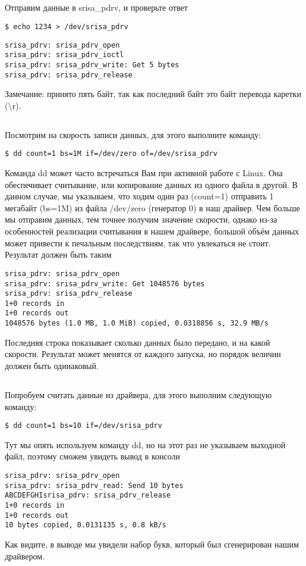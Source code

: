 \subsection{}Отправим данные в srisa\_pdrv, и проверьте ответ
\begin{lstlisting}[style=bash]
$ echo 1234 > /dev/srisa_pdrv
\end{lstlisting}
\begin{lstlisting}[style=stdout]
srisa_pdrv: srisa_pdrv_open
srisa_pdrv: srisa_pdrv_ioctl
srisa_pdrv: srisa_pdrv_write: Get 5 bytes
srisa_pdrv: srisa_pdrv_release
\end{lstlisting}
Замечание: принято пять байт, так как последний байт это байт перевода каретки (\textbackslash{}r). 

\subsection{}Посмотрим на скорость записи данных, для этого выполните команду:
\begin{lstlisting}[style=bash]
$ dd count=1 bs=1M if=/dev/zero of=/dev/srisa_pdrv 
\end{lstlisting}
Команда dd может часто встречаться Вам при активной работе с Linux. Она обеспечивает считывание, или копирование данных из одного файла в другой. В данном случае, мы указываем, что ходим один раз (count=1) отправить 1 мегабайт (bs=1M)  из файла /dev/zero (генератор 0) в наш драйвер. Чем больше мы отправим данных, тем точнее получим значение скорости, однако из-за особенностей реализации считывания в нашем драйвере, большой объём данных может привести к печальным последствиям, так что увлекаться не стоит. Результат должен быть таким
\begin{lstlisting}[style=stdout]
srisa_pdrv: srisa_pdrv_open
srisa_pdrv: srisa_pdrv_write: Get 1048576 bytes
srisa_pdrv: srisa_pdrv_release 
1+0 records in
1+0 records out
1048576 bytes (1.0 MB, 1.0 MiB) copied, 0.0318856 s, 32.9 MB/s
\end{lstlisting}
Последняя строка показывает сколько данных было передано, и на какой скорости. Результат может менятся от каждого запуска, но порядок величин должен быть одинаковый.

\subsection{}Попробуем считать данные из драйвера, для этого выполним следующую команду: 
\begin{lstlisting}[style=bash]
$ dd count=1 bs=10 if=/dev/srisa_pdrv
\end{lstlisting}
Тут мы опять используем команду dd, но на этот раз не указываем выходной файл, поэтому сможем увидеть вывод в консоли
\begin{lstlisting}[style=stdout]
srisa_pdrv: srisa_pdrv_open 
srisa_pdrv: srisa_pdrv_read: Send 10 bytes 
ABCDEFGHIsrisa_pdrv: srisa_pdrv_release 
1+0 records in 
1+0 records out 
10 bytes copied, 0.0131135 s, 0.8 kB/s
\end{lstlisting}
Как видите, в выводе мы увидели набор букв, который был сгенерирован нашим драйвером.  

